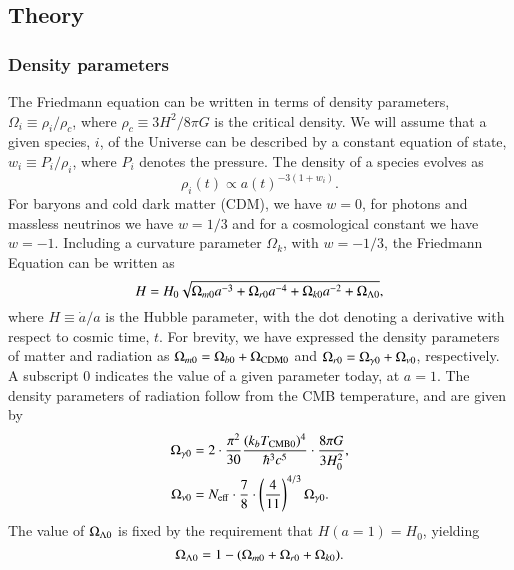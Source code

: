 

\subsection{Theory}\label{ssec:M1:theory}

\subsubsection{Density parameters}

The Friedmann equation can be written in terms of density parameters, $\Omega_i\equiv \rho_i/\rho_c$, where $\rho_c\equiv 3H^2/8\pi G$ is the critical density. We will assume that a given species, $i$, of the Universe can be described by a constant equation of state, $w_i \equiv P_i/\rho_i$, where $P_i$ denotes the pressure. The density of a species evolves as \cite[Eq. (2.72)]{Dodelson}
\begin{equation}
    \rho_i(t)\propto a(t)^{-3(1+w_i)}. \label{eq:M1:theory:rho_i_eos_dependence}
\end{equation}
%
%
For baryons and cold dark matter (CDM), we have $w=0$, for photons and massless neutrinos  we have $w=1/3$ and for a cosmological constant we have $w=-1$. Including a curvature parameter $\Omega_k$, with $w=-1/3$, the Friedmann Equation can be written as \cite[Eq. (3.14)]{Dodelson}  
\begin{equation}
    H = H_0 \sqrt{\Omega_{m0} a^{-3} + \Omega_{r0} a^{-4} + \Omega_{k0} a^{-2} + \Omega_{\Lambda 0}}, \label{eq:M1:theory:Friedmann_H_omegas}
\end{equation}
where $H\equiv\dot{a}/a$ is the Hubble parameter, with the dot denoting a derivative with respect to cosmic time, $t$. For brevity, we have expressed the density parameters of matter and radiation as $\Omega_{m0}=\Omega_{b0}+\Omega_\mathrm{CDM0}$ and $\Omega_{r0}=\Omega_{\gamma 0}+\Omega_{\nu 0}$, respectively. A subscript $0$ indicates the value of a given parameter today, at $a=1$. The density parameters of radiation follow from the CMB temperature, and are given by 
\begin{align}
    \Omega_{\gamma 0} &= 2 \cdot \frac{\pi^2}{30} \frac{(k_b T_\mathrm{CMB0})^4}{\hbar^3 c^5} \cdot \frac{8\pi G}{3H_0^2}, \label{eq:M1:theory:omega_gamma0_T} \\
    \Omega_{\nu 0} &= N_\mathrm{eff} \cdot \frac{7}{8} \cdot \left( \frac{4}{11} \right)^{4/3} \Omega_{\gamma 0}. \label{eq:M1:theory:omega_nu0_T}
\end{align}
%
%
The value of $\Omega_{\Lambda 0}$ is fixed by the requirement that $H(a=1)=H_0$, yielding 
\begin{equation}
    \Omega_{\Lambda 0} = 1 - (\Omega_{m0} + \Omega_{r0} + \Omega_{k0}). \label{eq:M1:theory:omega_lambda_0_normalization_condition}
\end{equation}
%

